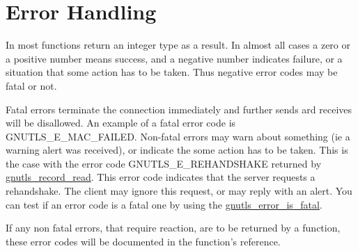 \section{Error Handling}
\par
In \gnutls most functions return an integer type as a result.
In almost all cases a zero or a positive number means success, and
a negative number indicates failure, or a situation that some
action has to be taken. Thus negative error codes may be fatal
or not. 
\par 
Fatal errors terminate the connection immediately and
further sends ard receives will be disallowed. An example of
a fatal error code is GNUTLS\_E\_MAC\_FAILED. Non-fatal errors
may warn about something (ie a warning alert was received), or
indicate the some action has to be taken. This is the case with
the error code GNUTLS\_E\_REHANDSHAKE returned by 
\hyperref{gnutls\_record\_read()}{gnutls\_record\_read() (see Section }{)}{gnutls_record_read}.
This error code indicates that the server requests a rehandshake. The client
may ignore this request, or may reply with an alert.
You can test if an error code is a fatal one by using the
\hyperref{gnutls\_error\_is\_fatal()}{gnutls\_error\_is\_fatal() (see Section }{)}{gnutls_error_is_fatal}.
\par
If any non fatal errors, that require reaction, are to be returned by a
function, these error codes will be documented
in the function's reference.

